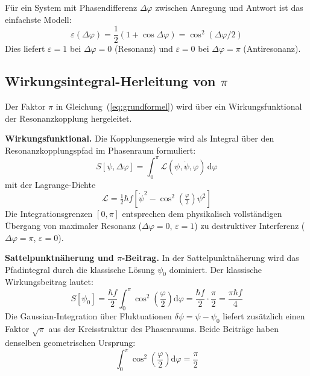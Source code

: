 \documentclass[12pt]{iopart}
\begin{document}
	F\"ur ein System mit Phasendifferenz $\Delta\varphi$
	zwischen Anregung und Antwort ist das einfachste Modell:
	\begin{equation}
		\varepsilon(\Delta\varphi) =
		\frac{1}{2}(1 + \cos\Delta\varphi)
		= \cos^2(\Delta\varphi/2)
		\label{eq:epsilon_cos}
	\end{equation}
	Dies liefert $\varepsilon = 1$ bei $\Delta\varphi = 0$
	(Resonanz) und $\varepsilon = 0$ bei
	$\Delta\varphi = \pi$ (Antiresonanz).
	
	\subsection{Wirkungsintegral-Herleitung von $\pi$}
	\label{sec:pi_action}
	
	Der Faktor $\pi$ in Gleichung~(\ref{eq:grundformel}) wird
	\"uber ein Wirkungsfunktional der Resonanzkopplung hergeleitet.
	
	\textbf{Wirkungsfunktional.}
	Die Kopplungsenergie wird als Integral \"uber den
	Resonanzkopplungspfad im Phasenraum formuliert:
	\begin{equation}
		S[\psi, \Delta\varphi]
		= \int_0^\pi \mathcal{L}(\psi, \dot\psi, \varphi)\,
		\mathrm{d}\varphi
		\label{eq:action_functional}
	\end{equation}
	mit der Lagrange-Dichte
	\begin{equation}
		\mathcal{L} = \tfrac{1}{2}\hbar f
		\!\left[\dot\psi^2
		- \cos^2\!\!\left(\tfrac{\varphi}{2}\right)\psi^2\right]
		\label{eq:lagrangian}
	\end{equation}
	Die Integrationsgrenzen $[0,\pi]$ entsprechen dem physikalisch
	vollst\"andigen \"Ubergang von maximaler Resonanz
	($\Delta\varphi = 0$, $\varepsilon = 1$) zu destruktiver
	Interferenz ($\Delta\varphi = \pi$, $\varepsilon = 0$).
	
	\textbf{Sattelpunktn\"aherung und $\pi$-Beitrag.}
	In der Sattelpunktn\"aherung wird das Pfadintegral durch
	die klassische L\"osung $\psi_0$ dominiert. Der klassische
	Wirkungsbeitrag lautet:
	\begin{equation}
		S[\psi_0]
		= \frac{\hbar f}{2}\int_0^\pi
		\cos^2\!\!\left(\frac{\varphi}{2}\right)\mathrm{d}\varphi
		= \frac{\hbar f}{2}\cdot\frac{\pi}{2}
		= \frac{\pi\hbar f}{4}
		\label{eq:saddle_action}
	\end{equation}
	Die Gaussian-Integration \"uber Fluktuationen
	$\delta\psi = \psi - \psi_0$ liefert zus\"atzlich einen
	Faktor $\sqrt{\pi}$ aus der Kreisstruktur des Phasenraums.
	Beide Beitr\"age haben denselben geometrischen Ursprung:
	\begin{equation}
		\int_0^\pi \cos^2\!\!\left(\frac{\varphi}{2}\right)
		\mathrm{d}\varphi = \frac{\pi}{2}
		\label{eq:half_period_integral}
	\end{equation}
	
\end{document}
